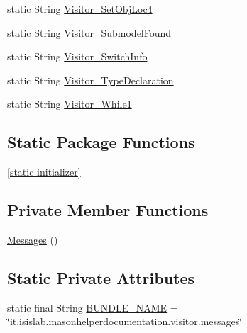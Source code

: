 \begin{DoxyCompactItemize}
\item 
static String \hyperlink{classit_1_1isislab_1_1masonhelperdocumentation_1_1visitor_1_1_messages_aaa3dd3d2614f9270e54f5ffc83bc75cd}{Visitor\-\_\-\-Set\-Obj\-Loc4}
\item 
static String \hyperlink{classit_1_1isislab_1_1masonhelperdocumentation_1_1visitor_1_1_messages_a5884a5e846065e9f930b30f4e3b5d8fa}{Visitor\-\_\-\-Submodel\-Found}
\item 
static String \hyperlink{classit_1_1isislab_1_1masonhelperdocumentation_1_1visitor_1_1_messages_a5ba10a5dfe764b0e2d6add4c13047fed}{Visitor\-\_\-\-Switch\-Info}
\item 
static String \hyperlink{classit_1_1isislab_1_1masonhelperdocumentation_1_1visitor_1_1_messages_a0425f530629f22e0c518246f33aa225b}{Visitor\-\_\-\-Type\-Declaration}
\item 
static String \hyperlink{classit_1_1isislab_1_1masonhelperdocumentation_1_1visitor_1_1_messages_a8b52faa8e610a01ecd3f2dd5d43838b9}{Visitor\-\_\-\-While1}
\end{DoxyCompactItemize}
\subsection*{Static Package Functions}
\begin{DoxyCompactItemize}
\item 
\hyperlink{classit_1_1isislab_1_1masonhelperdocumentation_1_1visitor_1_1_messages_a95874acb403cce1b0a6b7fb8263dc720}{\mbox{[}static initializer\mbox{]}}
\end{DoxyCompactItemize}
\subsection*{Private Member Functions}
\begin{DoxyCompactItemize}
\item 
\hyperlink{classit_1_1isislab_1_1masonhelperdocumentation_1_1visitor_1_1_messages_a8412c4bfa7d5bf1175781032937403af}{Messages} ()
\end{DoxyCompactItemize}
\subsection*{Static Private Attributes}
\begin{DoxyCompactItemize}
\item 
static final String \hyperlink{classit_1_1isislab_1_1masonhelperdocumentation_1_1visitor_1_1_messages_aaa372e9dc8d3c088f84bbe39395aed6f}{B\-U\-N\-D\-L\-E\-\_\-\-N\-A\-M\-E} = \char`\"{}it.\-isislab.\-masonhelperdocumentation.\-visitor.\-messages\char`\"{}
\end{DoxyCompactItemize}


